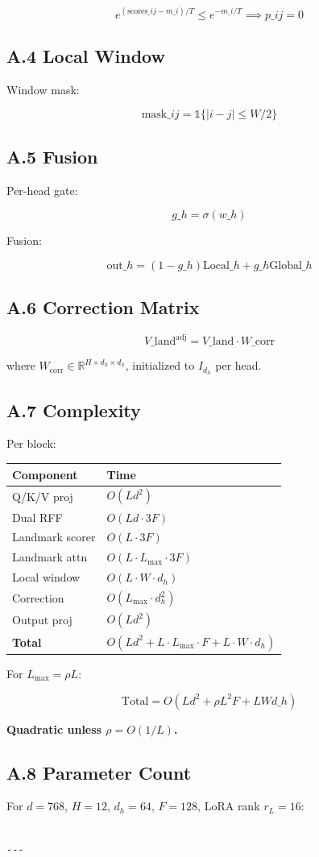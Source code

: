 \[
e^{(\text{scores}\_{ij} - m\_i)/T} \leq e^{-m\_i/T} \implies p\_{ij} = 0
\tag{A.9}
\]

\subsection{A.4 Local Window}

Window mask:

\[
\text{mask}\_{ij} = \mathbb{1}\{|i - j| \leq W/2\}
\tag{A.10}
\]

\subsection{A.5 Fusion}

Per-head gate:

\[
g\_h = \sigma(w\_h)
\tag{A.11}
\]

Fusion:

\[
\text{out}\_h = (1 - g\_h) \text{Local}\_h + g\_h \text{Global}\_h
\tag{A.12}
\]

\subsection{A.6 Correction Matrix}

\[
V\_\text{land}^\text{adj} = V\_\text{land} \cdot W\_\text{corr}
\tag{A.13}
\]

where $W_\text{corr} \in \mathbb{R}^{H \times d_h \times d_h}$, initialized 
to $I_{d_h}$ per head.

\subsection{A.7 Complexity}

Per block:

\begin{table}[H]
\centering
\small
\begin{tabular}{ll}
\toprule
\textbf{Component} & \textbf{Time} \\
\midrule
Q/K/V proj & $O(L d^2)$ \\
Dual RFF & $O(L d \cdot 3F)$ \\
Landmark scorer & $O(L \cdot 3F)$ \\
Landmark attn & $O(L \cdot L_\text{max} \cdot 3F)$ \\
Local window & $O(L \cdot W \cdot d_h)$ \\
Correction & $O(L_\text{max} \cdot d_h^2)$ \\
Output proj & $O(L d^2)$ \\
\textbf{Total} & $O(L d^2 + L \cdot L_\text{max} \cdot F + L \cdot W \cdot d_h)$ \\
\bottomrule
\end{tabular}
\end{table}

For $L_\text{max} = \rho L$:

\[
\text{Total} = O(L d^2 + \rho L^2 F + L W d\_h)
\]

\textbf{Quadratic unless $\rho = O(1/L)$.}

\subsection{A.8 Parameter Count}

For $d = 768$, $H = 12$, $d_h = 64$, $F = 128$, LoRA rank $r_L = 16$:

\begin{lstlisting}

---
\end{lstlisting}